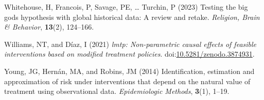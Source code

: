 \documentclass[
  single column]{article}
\newlength{\cslhangindent}
\newenvironment{CSLReferences}[2] %
 {\begin{list}{}{%
  \setlength{\itemindent}{0pt}
  \setlength{\leftmargin}{0pt}
  \setlength{\parsep}{0pt}
  \ifodd #1
   \setlength{\leftmargin}{\cslhangindent}
   \setlength{\itemindent}{-1\cslhangindent}
  \fi
  \setlength{\itemsep}{#2\baselineskip}}}
 {\end{list}}
\begin{document}
\begin{CSLReferences}{1}{0}
Whitehouse, H, Francois, P, Savage, PE, \ldots{} Turchin, P (2023)
Testing the big gods hypothesis with global historical data: A review
and retake. \emph{Religion, Brain \& Behavior}, \textbf{13}(2),
124--166.

Williams, NT, and Díaz, I (2021) \emph{{l}mtp: Non-parametric causal
effects of feasible interventions based on modified treatment policies}.
doi:\href{https://doi.org/10.5281/zenodo.3874931}{10.5281/zenodo.3874931}.

Young, JG, Hernán, MA, and Robins, JM (2014) Identification, estimation
and approximation of risk under interventions that depend on the natural
value of treatment using observational data. \emph{Epidemiologic
Methods}, \textbf{3}(1), 1--19.

\end{CSLReferences}
\end{document}
